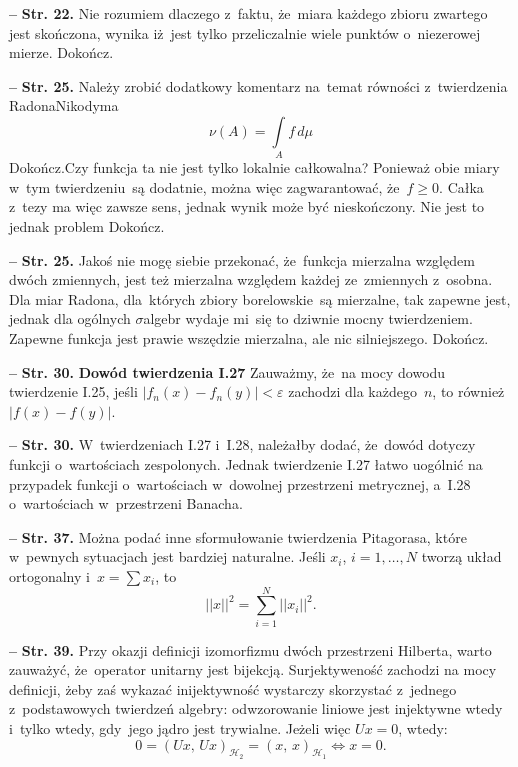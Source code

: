 \documentclass[a4paper,11pt]{article}
\newcommand{\spaceTwo}{1em}
\newcommand{\ld}{\ldots}
\newcommand{\mc}{\mathcal}
\newcommand{\wtw}{wtedy i~tylko wtedy}
\newcommand{\veps}{\varepsilon}
\newcommand{\si}{\sigma}
\newcommand{\Hc}{\mc{H}}
\newcommand{\Sum}{\sum\limits}
\newcommand{\Int}{\int\limits}
\newcommand{\IntSet}[3]{\Int_{ #1 } #2 \, d#3} %
\providecommand{\absj}[1]{\lvert #1 \rvert}
\newcommand{\norm}[1]{\left|\left| #1 \right|\right|}
\newcommand{\tb}{\textbf}
\newcommand{\noi}{\noindent}
\newcommand{\start}{\noi \tb{--} {}}
\newcommand{\Str}[1]{\tb{Str. #1.}}
\newcommand{\Dok}{{\color{red} Dokończ.}}
\newcommand{\SP}[2]{( #1, \, #2 )} %
\begin{document}
\vspace{\spaceTwo}


\start \Str{22} Nie rozumiem dlaczego z~faktu, że~miara każdego zbioru
zwartego jest skończona, wynika iż~jest tylko przeliczalnie wiele
punktów o~niezerowej mierze. \Dok

\vspace{\spaceTwo}


\start \Str{25} Należy zrobić dodatkowy komentarz na~temat równości
z~twierdzenia Radona\dywiz Nikodyma
\begin{equation}
  \label{eq:2}
  \nu( A ) = \IntSet{ A }{ f }{ \mu }
\end{equation}
\Dok Czy funkcja ta nie jest tylko lokalnie całkowalna? Ponieważ obie
miary w~tym twierdzeniu~są dodatnie, można więc zagwarantować,
że~$f \geq 0$. Całka z~tezy ma więc zawsze sens, jednak wynik może być
nieskończony. Nie jest to jednak problem \Dok


\start \Str{25} Jakoś nie mogę siebie przekonać, że~funkcja mierzalna
względem dwóch zmiennych, jest też mierzalna względem każdej
ze~zmiennych z~osobna. Dla miar Radona, dla~których zbiory
borelowskie~są mierzalne, tak zapewne jest, jednak dla ogólnych
$\si$\dywiz algebr wydaje mi~się to dziwnie mocny twierdzeniem.
Zapewne funkcja jest prawie wszędzie mierzalna, ale nic silniejszego.
\Dok


\start \Str{30} \tb{Dowód twierdzenia I.27} Zauważmy, że~na mocy
dowodu twierdzenie I.25, jeśli
$\absj{ f_{ n }( x ) - f_{ n }( y ) } < \veps$ zachodzi dla
każdego~$n$, to również $\absj{ f( x ) - f( y ) }$.


\start \Str{30} W~twierdzeniach I.27 i~I.28, należałby dodać, że~dowód
dotyczy funkcji o~wartościach zespolonych. Jednak twierdzenie I.27
łatwo uogólnić na przypadek funkcji o~wartościach w~dowolnej
przestrzeni metrycznej, a~I.28 o~wartościach w~przestrzeni Banacha.


\start \Str{37} Można podać inne sformułowanie twierdzenia Pitagorasa,
które w~pewnych sytuacjach jest bardziej naturalne. Jeśli $x_{ i }$,
$i = 1, \ld, N$ tworzą układ ortogonalny i~$x = \Sum x_{ i }$, to
\begin{equation*}
  \norm{ x }^{ 2 } = \Sum_{ i = 1 }^{ N } \norm{ x_{ i } }^{ 2 }.
\end{equation*}


\start \Str{39} Przy okazji definicji izomorfizmu dwóch przestrzeni
Hilberta, warto zauważyć, że~operator unitarny jest bijekcją.
Surjektyweność zachodzi na mocy definicji, żeby zaś wykazać
inijektywność wystarczy skorzystać z~jednego z~podstawowych twierdzeń
algebry: odwzorowanie liniowe jest injektywne \wtw, gdy~jego jądro
jest trywialne. Jeżeli więc $Ux = 0$, wtedy:
\begin{equation*}
  0 = \SP{ Ux }{ Ux }_{ \Hc_{ 2 } } = \SP{ x }{ x }_{ \Hc_{ 1 } } \iff x = 0.
\end{equation*}
\end{document}
